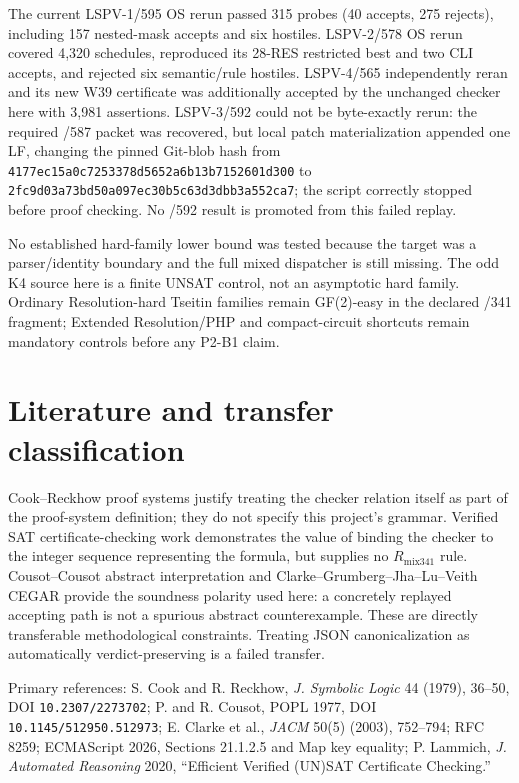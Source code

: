 \documentclass[11pt]{article}
\begin{document}
The current LSPV-1/595 OS rerun passed 315 probes (40 accepts, 275 rejects),
including 157 nested-mask accepts and six hostiles.  LSPV-2/578 OS rerun covered
4,320 schedules, reproduced its 28-RES restricted best and two CLI accepts, and
rejected six semantic/rule hostiles.  LSPV-4/565 independently reran and its new
W39 certificate was additionally accepted by the unchanged checker here with
3,981 assertions.  LSPV-3/592 could not be byte-exactly rerun: the required
/587 packet was recovered, but local patch materialization appended one LF,
changing the pinned Git-blob hash from
\texttt{4177ec15a0c7253378d5652a6b13b7152601d300} to
\texttt{2fc9d03a73bd50a097ec30b5c63d3dbb3a552ca7}; the script correctly stopped
before proof checking.  No /592 result is promoted from this failed replay.

No established hard-family lower bound was tested because the target was a
parser/identity boundary and the full mixed dispatcher is still missing.  The
odd K4 source here is a finite UNSAT control, not an asymptotic hard family.
Ordinary Resolution-hard Tseitin families remain GF(2)-easy in the declared
/341 fragment; Extended Resolution/PHP and compact-circuit shortcuts remain
mandatory controls before any P2-B1 claim.

\section{Literature and transfer classification}

Cook--Reckhow proof systems justify treating the checker relation itself as part
of the proof-system definition; they do not specify this project's grammar.
Verified SAT certificate-checking work demonstrates the value of binding the
checker to the integer sequence representing the formula, but supplies no
$R_{\mathrm{mix341}}$ rule.  Cousot--Cousot abstract interpretation and
Clarke--Grumberg--Jha--Lu--Veith CEGAR provide the soundness polarity used here:
a concretely replayed accepting path is not a spurious abstract counterexample.
These are directly transferable methodological constraints.  Treating JSON
canonicalization as automatically verdict-preserving is a failed transfer.

Primary references: S. Cook and R. Reckhow, \emph{J. Symbolic Logic} 44 (1979),
36--50, DOI \texttt{10.2307/2273702}; P. and R. Cousot, POPL 1977,
DOI \texttt{10.1145/512950.512973}; E. Clarke et al., \emph{JACM} 50(5)
(2003), 752--794; RFC 8259; ECMAScript 2026, Sections 21.1.2.5 and Map key
equality; P. Lammich, \emph{J. Automated Reasoning} 2020, ``Efficient Verified
(UN)SAT Certificate Checking.''
\end{document}
